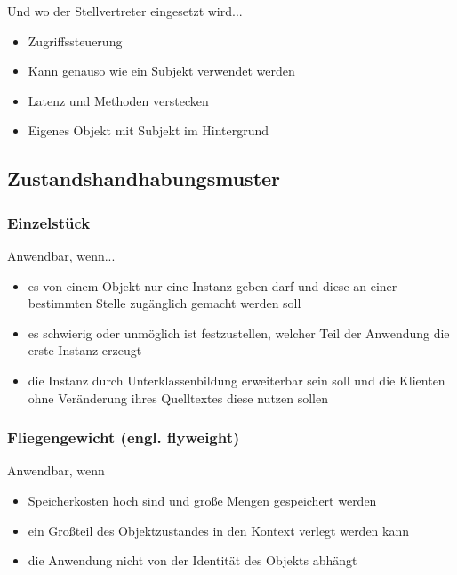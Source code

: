 Und wo der Stellvertreter eingesetzt wird...
\begin{itemize}
    \item Zugriffssteuerung
    \item Kann genauso wie ein Subjekt verwendet werden
    \item Latenz und Methoden verstecken
    \item Eigenes Objekt mit Subjekt im Hintergrund
\end{itemize}


\subsection{Zustandshandhabungsmuster}
\subsubsection{Einzelstück}


Anwendbar, wenn...
\begin{itemize}
    \item es von einem Objekt nur eine Instanz geben darf und diese an einer bestimmten Stelle zugänglich gemacht werden soll
    \item es schwierig oder unmöglich ist festzustellen, welcher Teil der Anwendung die erste Instanz erzeugt
    \item die Instanz durch Unterklassenbildung erweiterbar sein soll und die Klienten ohne Veränderung ihres Quelltextes diese nutzen sollen
\end{itemize}


\subsubsection{Fliegengewicht (engl. flyweight)}
Anwendbar, wenn
\begin{itemize}
    \item Speicherkosten hoch sind und große Mengen gespeichert werden
    \item ein Großteil des Objektzustandes in den Kontext verlegt werden kann
    \item die Anwendung nicht von der Identität des Objekts abhängt
\end{itemize}



